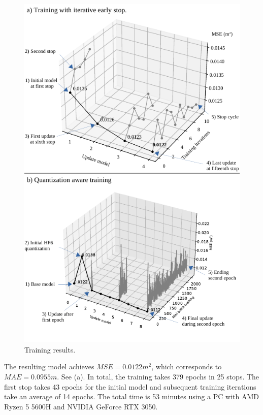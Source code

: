 \begin{figure}[h!]
	\centering
	\includegraphics[width=\columnwidth]{../figures/histograms/training_and_quantization.pdf}
	\caption{Training results.}
	\label{fig:optimization}
\end{figure}

The resulting model achieves $MSE=0.0122m^2$, which corresponds to $MAE=0.0955m$. See (a). In total, the training takes 379 epochs in 25 stops. The first stop takes 43 epochs for the initial model and subsequent training iterations take an average of 14 epochs. The total time is 53 minutes using a PC with AMD Ryzen 5 5600H and NVIDIA GeForce RTX 3050.

